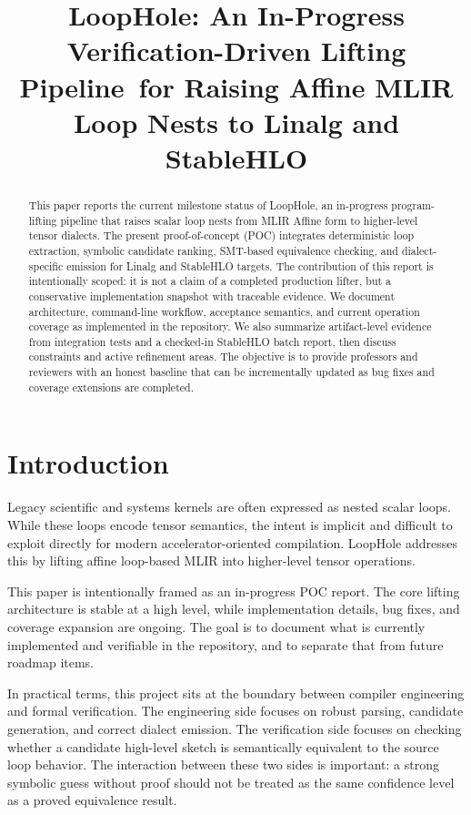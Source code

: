 \documentclass[conference]{IEEEtran}
\title{LoopHole: An In-Progress Verification-Driven Lifting Pipeline\
for Raising Affine MLIR Loop Nests to Linalg and StableHLO}
\author{\IEEEauthorblockN{Yash Sharma} \IEEEauthorblockA{LoopHole Project (POC Milestone Report)}}
\begin{document}
\maketitle

\begin{abstract}
This paper reports the current milestone status of LoopHole, an in-progress program-lifting pipeline that raises scalar loop nests from MLIR Affine form to higher-level tensor dialects. The present proof-of-concept (POC) integrates deterministic loop extraction, symbolic candidate ranking, SMT-based equivalence checking, and dialect-specific emission for Linalg and StableHLO targets. The contribution of this report is intentionally scoped: it is not a claim of a completed production lifter, but a conservative implementation snapshot with traceable evidence. We document architecture, command-line workflow, acceptance semantics, and current operation coverage as implemented in the repository. We also summarize artifact-level evidence from integration tests and a checked-in StableHLO batch report, then discuss constraints and active refinement areas. The objective is to provide professors and reviewers with an honest baseline that can be incrementally updated as bug fixes and coverage extensions are completed.
\end{abstract}

\section{Introduction}
Legacy scientific and systems kernels are often expressed as nested scalar loops. While these loops encode tensor semantics, the intent is implicit and difficult to exploit directly for modern accelerator-oriented compilation. LoopHole addresses this by lifting affine loop-based MLIR into higher-level tensor operations.

This paper is intentionally framed as an in-progress POC report. The core lifting architecture is stable at a high level, while implementation details, bug fixes, and coverage expansion are ongoing. The goal is to document what is currently implemented and verifiable in the repository, and to separate that from future roadmap items.

In practical terms, this project sits at the boundary between compiler engineering and formal verification. The engineering side focuses on robust parsing, candidate generation, and correct dialect emission. The verification side focuses on checking whether a candidate high-level sketch is semantically equivalent to the source loop behavior. The interaction between these two sides is important: a strong symbolic guess without proof should not be treated as the same confidence level as a proved equivalence result.
\end{document}
